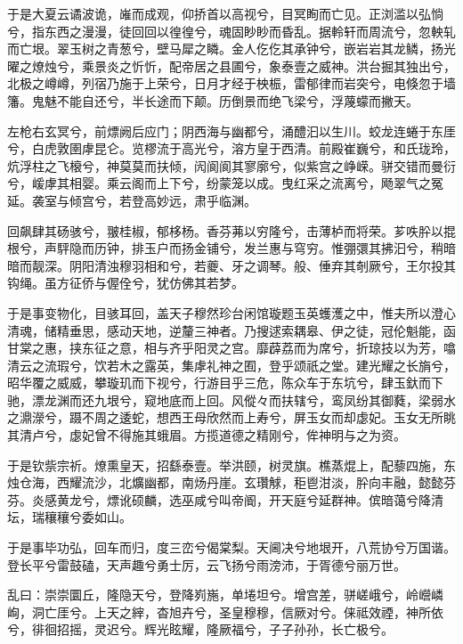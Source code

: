 \documentclass[12pt,UTF8]{ctexbook}
\begin{document}
于是大夏云谲波诡，嶉而成观，仰挢首以高视兮，目冥眴而亡见。正浏滥以弘惝兮，指东西之漫漫，徒回回以徨徨兮，魂固眇眇而昏乱。据軨轩而周流兮，忽軮轧而亡垠。翠玉树之青葱兮，壁马犀之瞵。金人仡仡其承钟兮，嵌岩岩其龙鳞，扬光曜之燎烛兮，乘景炎之忻忻，配帝居之县圃兮，象泰壹之威神。洪台掘其独出兮，北极之嶟嶟，列宿乃施于上荣兮，日月才经于柍桭，雷郁律而岩突兮，电倏忽于墙籓。鬼魅不能自还兮，半长途而下颠。历倒景而绝飞梁兮，浮蔑蠓而撇天。



左枪右玄冥兮，前熛阙后应门；阴西海与幽都兮，涌醴汩以生川。蛟龙连蜷于东厓兮，白虎敦圉虖昆仑。览樛流于高光兮，溶方皇于西清。前殿崔巍兮，和氏珑玲，炕浮柱之飞榱兮，神莫莫而扶倾，闶阆阆其寥廓兮，似紫宫之峥嵘。骈交错而曼衍兮，嵈虖其相婴。乘云阁而上下兮，纷蒙笼以成。曳红采之流离兮，飏翠气之冤延。袭室与倾宫兮，若登高妙远，肃乎临渊。



回飙肆其砀骇兮，翍桂椒，郁栘杨。香芬茀以穷隆兮，击薄栌而将荣。芗呹肸以掍根兮，声駍隐而历钟，排玉户而扬金铺兮，发兰惠与穹穷。惟弸彋其拂汩兮，稍暗暗而靓深。阴阳清浊穆羽相和兮，若夔、牙之调琴。般、倕弃其剞厥兮，王尔投其钩绳。虽方征侨与偓佺兮，犹仿佛其若梦。



于是事变物化，目骇耳回，盖天子穆然珍台闲馆璇题玉英蠖濩之中，惟夫所以澄心清魂，储精垂思，感动天地，逆釐三神者。乃搜逑索耦皋、伊之徒，冠伦魁能，函甘棠之惠，挟东征之意，相与齐乎阳灵之宫。靡薜荔而为席兮，折琼技以为芳，噏清云之流瑕兮，饮若木之露英，集虖礼神之囿，登乎颂祇之堂。建光耀之长旓兮，昭华覆之威威，攀璇玑而下视兮，行游目乎三危，陈众车于东坑兮，肆玉釱而下驰，漂龙渊而还九垠兮，窥地底而上回。风傱々而扶辖兮，鸾凤纷其御蕤，梁弱水之濎濴兮，蹑不周之逶蛇，想西王母欣然而上寿兮，屏玉女而却虙妃。玉女无所眺其清卢兮，虙妃曾不得施其蛾眉。方揽道德之精刚兮，侔神明与之为资。



于是钦祡宗祈。燎熏皇天，招繇泰壹。举洪颐，树灵旗。樵蒸焜上，配藜四施，东烛仓海，西耀流沙，北爌幽都，南炀丹崖。玄瓚觩，秬鬯泔淡，肸向丰融，懿懿芬芬。炎感黄龙兮，熛讹硕麟，选巫咸兮叫帝阍，开天庭兮延群神。傧暗蔼兮降清坛，瑞穰穰兮委如山。



于是事毕功弘，回车而归，度三峦兮偈棠梨。天阃决兮地垠开，八荒协兮万国谐。登长平兮雷鼓磕，天声趣兮勇士厉，云飞扬兮雨滂沛，于胥德兮丽万世。



乱曰：崇崇圜丘，隆隐天兮，登降峛崺，单埢坦兮。增宫差，骈嵯峨兮，岭巆嶙峋，洞亡厓兮。上天之縡，杳旭卉兮，圣皇穆穆，信厥对兮。俫祗效禋，神所依兮，徘徊招摇，灵迟兮。辉光眩耀，隆厥福兮，子子孙孙，长亡极兮。
\end{document}
